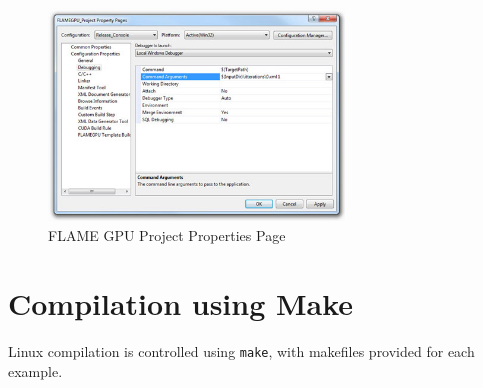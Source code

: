 \documentclass[11pt, a4paper, onecolumn, oneside]{report}
\begin{document}
\begin{figure}[ht]
    \centering
    \includegraphics[width=0.70\textwidth]{img/figure3}
    \caption{FLAME GPU Project Properties Page}
    \label{fig:project-properties-page}
\end{figure} 

\section{Compilation using Make}
\label{sec:compilation-makefile}

Linux compilation is controlled using \verb|make|, with makefiles provided for each example. 
\end{document}
